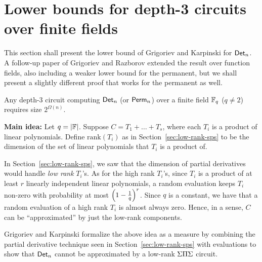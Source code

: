 \section{Lower bounds for depth-3 circuits over finite fields}

This section shall present the lower bound of Grigoriev and Karpinski
\cite{grigoriev98} for $\mathsf{Det}_n$. A follow-up paper of Grigoriev and
Razborov \cite{gr00} extended the result over function fields, also
including a weaker lower bound for the permanent, but we shall present a slightly different proof that works for the permanent as well. 

\begin{theorem}\cite{grigoriev98}\label{thm:gk-main-thm}
  Any depth-3 circuit computing $\mathsf{Det}_n$ (or $\mathsf{Perm}_n$) over a finite field $\mathbb{F}_q$ ($q\neq 2$)
  requires size $2^{\Omega(n)}$.
\end{theorem}

{\bf Main idea:} Let $q = |\mathbb{F}|$. Suppose $C = T_1 + \dots + T_s$,
where each $T_i$ is a product of linear polynomials. Define
$\mathrm{rank}(T_i)$ as in Section~\ref{sec:low-rank-sps} to be the
dimension of the set of linear polynomials that $T_i$ is a product
of. 

In Section~\ref{sec:low-rank-sps}, we saw that the dimension of partial
derivatives would handle \emph{low rank} $T_i$'s. As for the high rank $T_i$'s, since $T_i$ is a product of at least $r$ linearly independent linear polynomials, a random evaluation keeps $T_i$ non-zero with probability at most $\left(1-\frac{1}{q}\right)^r$. Since $q$ is a constant, we have that a random evaluation of a high rank $T_i$ is almost always zero. Hence, in a sense, $C$ can be
``approximated'' by just the low-rank components. 


Grigoriev and Karpinski \cite{grigoriev98} formalize the above idea as
a measure by combining the partial derivative technique seen in Section~\ref{sec:low-rank-sps} with evaluations  to show that $\mathsf{Det}_n$ cannot be
approximated by a low-rank $\Sigma\Pi\Sigma$ circuit.

